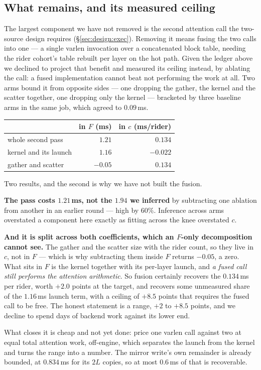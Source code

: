 \subsection{What remains, and its measured ceiling}

The largest component we have not removed is the second attention call the
two-source design requires (\S\ref{sec:design:exec}). Removing it means fusing the two calls into one
--- a single varlen invocation over a concatenated block table, needing the rider
cohort's table rebuilt per layer on the hot path. Given the ledger above we declined
to project that benefit and measured its ceiling instead, by ablating the call: a
fused implementation cannot beat not performing the work at all. Two arms bound it
from opposite sides --- one dropping the gather, the kernel and the scatter together,
one dropping only the kernel --- bracketed by three baseline arms in the same job,
which agreed to $0.09$\,ms.

\begin{center}\small
\begin{tabular}{lrr}
\toprule
 & in $F$ (ms) & in $c$ (ms/rider) \\
\midrule
whole second pass       & $1.21$  & $0.134$ \\
kernel and its launch   & $1.16$  & $-0.022$ \\
gather and scatter      & $-0.05$ & $0.134$ \\
\bottomrule
\end{tabular}
\end{center}

Two results, and the second is why we have not built the fusion.

\textbf{The pass costs $1.21$\,ms, not the $1.94$ we inferred} by subtracting one
ablation from another in an earlier round --- high by $60\%$. Inference across arms
overstated a component here exactly as fitting across the knee overstated $c$.

\textbf{And it is split across both coefficients, which an $F$-only decomposition
cannot see.} The gather and the scatter size with the rider count, so they live in
$c$, not in $F$ --- which is why subtracting them inside $F$ returns $-0.05$, a
zero. What sits in $F$ is the kernel together with its per-layer launch, and
\emph{a fused call still performs the attention arithmetic}. So fusion certainly
recovers the $0.134$\,ms per rider, worth $+2.0$ points at the target, and recovers
some unmeasured share of the $1.16$\,ms launch term, with a ceiling of $+8.5$ points
that requires the fused call to be free. The honest statement is a range, $+2$ to
$+8.5$ points, and we decline to spend days of backend work against its lower end.

What closes it is cheap and not yet done: price one varlen call against two at equal
total attention work, off-engine, which separates the launch from the kernel and
turns the range into a number. The mirror write's own remainder is already bounded,
at $0.834$\,ms for its $2L$ copies, so at most $0.6$\,ms of that is recoverable.
